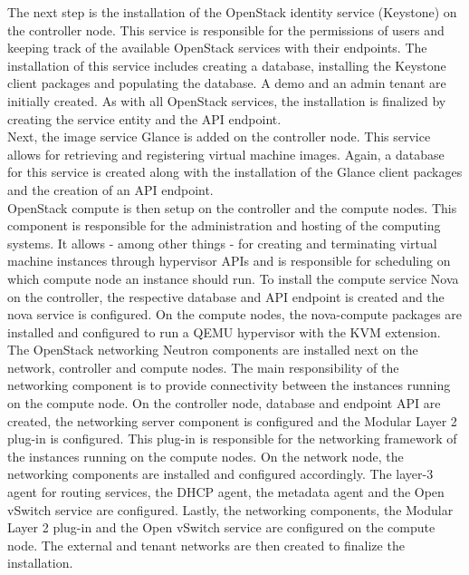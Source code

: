 The next step is the installation of the OpenStack identity service (Keystone) on the controller node. This service is responsible for the permissions of users and keeping track of the available OpenStack services with their endpoints. The installation of this service includes creating a database, installing the Keystone client packages and populating the database. A demo and an admin tenant are initially created. As with all OpenStack services, the installation is finalized by creating the service entity and the API endpoint.\\

Next, the image service Glance is added on the controller node. This service allows for retrieving and registering virtual machine images. Again, a database for this service is created along with the installation of the Glance client packages and the creation of an API endpoint.\\

OpenStack compute is then setup on the controller and the compute nodes. This component is responsible for the administration and hosting of the computing systems. It allows - among other things - for creating and terminating virtual machine instances through hypervisor APIs and is responsible for scheduling on which compute node an instance should run. To install the compute service Nova on the controller, the respective database and API endpoint is created and the nova service is configured. On the compute nodes, the nova-compute packages are installed and configured to run a QEMU hypervisor with the KVM extension.\\

The OpenStack networking Neutron components are installed next on the network, controller and compute nodes. The main responsibility of the networking component is to provide connectivity between the instances running on the compute node. On the controller node, database and endpoint API are created, the networking server component is configured and the Modular Layer 2 plug-in is configured. This plug-in is responsible for the networking framework of the instances running on the compute nodes. On the network node, the networking components are installed and configured accordingly. The layer-3 agent for routing services, the DHCP agent, the metadata agent and the Open vSwitch service are configured. Lastly, the networking components, the Modular Layer 2 plug-in and the Open vSwitch service are configured on the compute node. The external and tenant networks are then created to finalize the installation.\\

